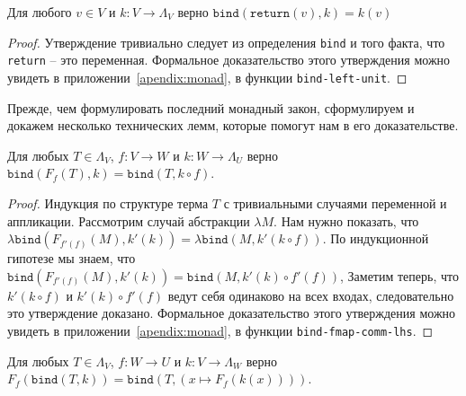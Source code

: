\begin{prop}
  \label{monad:bind-left-unit}
  Для любого $v \in V$ и $k : V \to \Lambda_{V}$ верно $\texttt{bind}(\texttt{return}(v), k) = k(v)$
\end{prop}

\begin{proof}
  Утверждение тривиально следует из определения \texttt{bind} и того факта, что \texttt{return} -- это переменная. Формальное доказательство этого утверждения можно увидеть в приложении~\ref{apendix:monad}, в функции \texttt{bind-left-unit}.
\end{proof}

Прежде, чем формулировать последний монадный закон, сформулируем и докажем несколько технических лемм, которые помогут нам в его доказательстве.

\begin{lemma}
  \label{monad:bind-fmap-comm-lhs}
  Для любых $T \in \Lambda_{V}$, $f : V \to W$ и $k : W \to \Lambda_{U}$ верно $\texttt{bind}(F_{f}(T), k) = \texttt{bind}(T, k \circ f)$.
\end{lemma}

\begin{proof}
  Индукция по структуре терма $T$ с тривиальными случаями переменной и аппликации. Рассмотрим случай абстракции $\lambda M$. Нам нужно показать, что $\lambda \texttt{bind}(F_{f'(f)}(M), k'(k)) = \lambda \texttt{bind}(M, k'(k \circ f))$. По индукционной гипотезе мы знаем, что $\texttt{bind}(F_{f'(f)}(M), k'(k)) = \texttt{bind}(M, k'(k) \circ f'(f))$, Заметим теперь, что $k'(k \circ f)$ и $k'(k) \circ f'(f)$ ведут себя одинаково на всех входах, следовательно это утверждение доказано. Формальное доказательство этого утверждения можно увидеть в приложении~\ref{apendix:monad}, в функции \texttt{bind-fmap-comm-lhs}.
\end{proof}

\begin{lemma}
  \label{monad:bind-fmap-comm-rhs}
  Для любых $T \in \Lambda_{V}$, $f : W \to U$ и $k : V \to \Lambda_{W}$ верно $ F_{f}(\texttt{bind}(T, k)) = \texttt{bind}(T, (x \mapsto F_{f}(k(x))))$.
\end{lemma}

